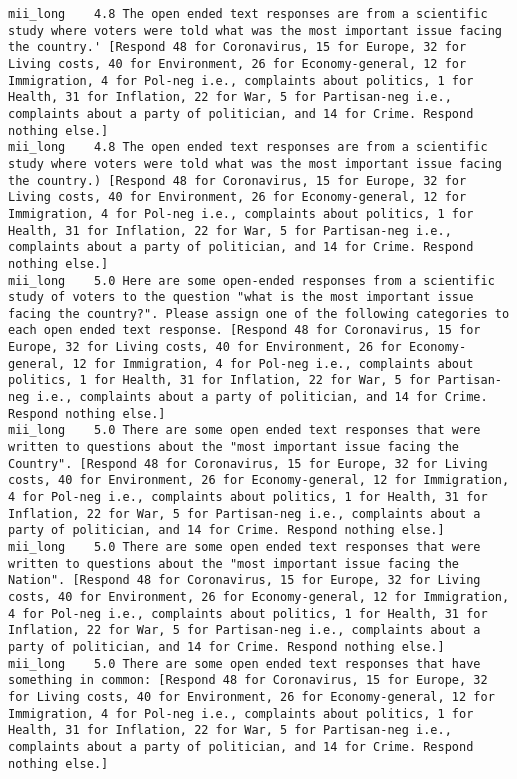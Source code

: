 \begin{lstlisting}[label=lst:promptvariants]
mii_long	4.8	The open ended text responses are from a scientific study where voters were told what was the most important issue facing the country.' [Respond 48 for Coronavirus, 15 for Europe, 32 for Living costs, 40 for Environment, 26 for Economy-general, 12 for Immigration, 4 for Pol-neg i.e., complaints about politics, 1 for Health, 31 for Inflation, 22 for War, 5 for Partisan-neg i.e., complaints about a party of politician, and 14 for Crime. Respond nothing else.]
mii_long	4.8	The open ended text responses are from a scientific study where voters were told what was the most important issue facing the country.) [Respond 48 for Coronavirus, 15 for Europe, 32 for Living costs, 40 for Environment, 26 for Economy-general, 12 for Immigration, 4 for Pol-neg i.e., complaints about politics, 1 for Health, 31 for Inflation, 22 for War, 5 for Partisan-neg i.e., complaints about a party of politician, and 14 for Crime. Respond nothing else.]
mii_long	5.0	Here are some open-ended responses from a scientific study of voters to the question "what is the most important issue facing the country?". Please assign one of the following categories to each open ended text response. [Respond 48 for Coronavirus, 15 for Europe, 32 for Living costs, 40 for Environment, 26 for Economy-general, 12 for Immigration, 4 for Pol-neg i.e., complaints about politics, 1 for Health, 31 for Inflation, 22 for War, 5 for Partisan-neg i.e., complaints about a party of politician, and 14 for Crime. Respond nothing else.]
mii_long	5.0	There are some open ended text responses that were written to questions about the "most important issue facing the Country". [Respond 48 for Coronavirus, 15 for Europe, 32 for Living costs, 40 for Environment, 26 for Economy-general, 12 for Immigration, 4 for Pol-neg i.e., complaints about politics, 1 for Health, 31 for Inflation, 22 for War, 5 for Partisan-neg i.e., complaints about a party of politician, and 14 for Crime. Respond nothing else.]
mii_long	5.0	There are some open ended text responses that were written to questions about the "most important issue facing the Nation". [Respond 48 for Coronavirus, 15 for Europe, 32 for Living costs, 40 for Environment, 26 for Economy-general, 12 for Immigration, 4 for Pol-neg i.e., complaints about politics, 1 for Health, 31 for Inflation, 22 for War, 5 for Partisan-neg i.e., complaints about a party of politician, and 14 for Crime. Respond nothing else.]
mii_long	5.0	There are some open ended text responses that have something in common: [Respond 48 for Coronavirus, 15 for Europe, 32 for Living costs, 40 for Environment, 26 for Economy-general, 12 for Immigration, 4 for Pol-neg i.e., complaints about politics, 1 for Health, 31 for Inflation, 22 for War, 5 for Partisan-neg i.e., complaints about a party of politician, and 14 for Crime. Respond nothing else.]

\end{lstlisting}

